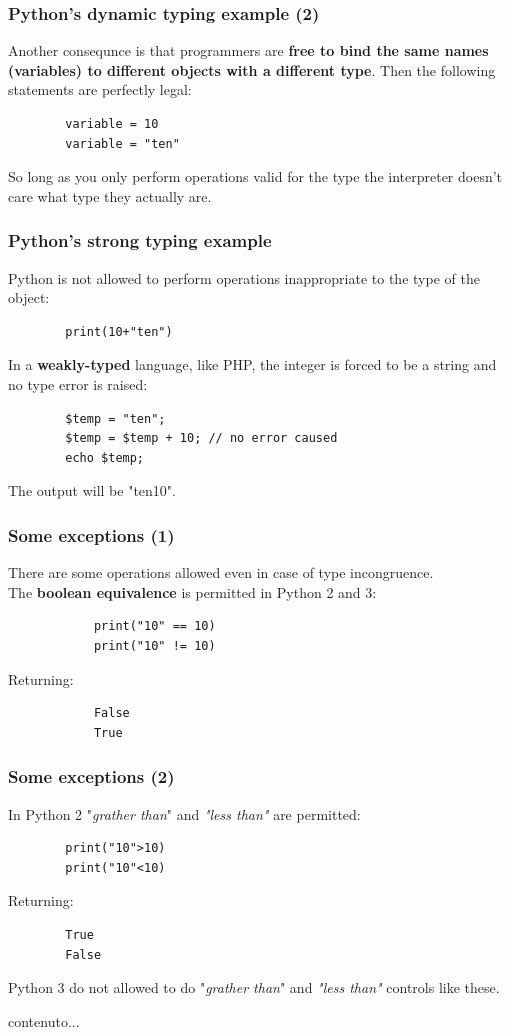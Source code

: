 \documentclass[xcolor ={table,usenames,dvipsnames}]{beamer}
\theoremstyle{definition}
\begin{document}
	\begin{frame}[fragile]
		\frametitle{Python's dynamic typing example (2)}
		Another consequnce is that programmers are \textbf{free to bind the same names (variables) to different objects with a different type}. Then the following statements are perfectly legal:
		
		\begin{lstlisting}
		variable = 10
		variable = "ten"
		\end{lstlisting}
		
		So long as you only perform operations valid for the type the interpreter doesn't care what type they actually are. 
	\end{frame}

	\begin{frame}[fragile]
		\frametitle{Python's strong typing example}
		Python is not allowed to perform operations inappropriate to the type of the object: 
		\begin{lstlisting}
		print(10+"ten")
		\end{lstlisting}
		
		In a \textbf{weakly-typed} language, like PHP, the integer is forced to be a string and no type error is raised:
		\begin{lstlisting}
		$temp = "ten"; 
		$temp = $temp + 10; // no error caused
		echo $temp;
		\end{lstlisting}
	The output will be "ten10".
	\end{frame}

	\begin{frame}[fragile]
		\frametitle{Some exceptions (1)}
		There are some operations allowed even in case of type incongruence.\\
		The\textbf{ boolean equivalence} is permitted in Python 2 and 3: 
		
		\begin{lstlisting}
			print("10" == 10)
			print("10" != 10)
		\end{lstlisting}
		Returning:
		\begin{lstlisting}
			False
			True
		\end{lstlisting}
	\end{frame}

	\begin{frame}[fragile]
		\frametitle{Some exceptions (2)}
		In Python 2 "\textit{grather than}" and \textit{"less than"} are permitted:
		
		\begin{lstlisting}
		print("10">10)
		print("10"<10)
		\end{lstlisting}
		
		Returning:
		
		\begin{lstlisting}
		True
		False
		\end{lstlisting}
		
		Python 3 do not allowed to do "\textit{grather than}" and \textit{"less than"} controls like these.\\	
	\end{frame}

	\begin{frame}
		contenuto...
	\end{frame}
		
	
	

	
	
	
	
	
	
	
	
	
	
	
\end{document}
